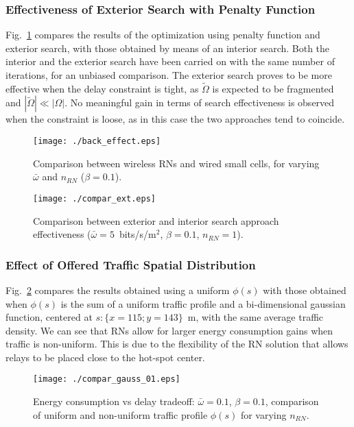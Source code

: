 \documentclass[draftcls,onecolumn]{IEEEtran}
\theoremstyle{plain}
\theoremstyle{definition}
\begin{document}
\subsubsection{Effectiveness of Exterior Search with Penalty Function}
Fig.~\ref{fig:compar_ext} compares the results of the optimization using penalty function and exterior search, with those obtained by means of an interior search. Both the interior and the exterior search have been carried on with the same number of iterations, for an unbiased comparison. The exterior search proves to be more effective when the delay constraint is tight, as $\tilde{\Omega}$ is expected to be fragmented and $|\tilde{\Omega}| \ll |\Omega |$. No meaningful gain in terms of search effectiveness is observed when the constraint is loose, as in this case the two approaches tend to coincide.
\begin{figure}
\centering
\begin{minipage}{.47\textwidth}
\centering
\texttt{[image: ./back\_effect.eps]} 
\caption{Comparison between wireless RNs and wired small cells, for varying $\bar{\omega}$ and $n_{RN}$ ($\beta=0.1$).}
\label{fig:back_effect}
\end{minipage}\hfill
\begin{minipage}{.47\textwidth}
\centering
\texttt{[image: ./compar\_ext.eps]}
\caption{Comparison between exterior and interior search approach effectiveness ($\bar{\omega}=5$~bits/s/m$^2$, $\beta=0.1$, $n_{RN}=1$).}
\label{fig:compar_ext}
\end{minipage}
\end{figure}

\subsubsection{Effect of Offered Traffic Spatial Distribution}\label{non_unif}
Fig.~\ref{fig:compar_gauss} compares the results obtained using a uniform $\phi(s)$ with those obtained when $\phi(s)$ is the sum of a uniform traffic profile and a bi-dimensional gaussian function, centered at $s:\{x=115 ; y=143 \}$~m, with the same average traffic density. We can see that RNs allow for larger energy consumption gains when traffic is non-uniform. This is due to the flexibility of the RN solution that allows relays to be placed close to the hot-spot center. 
\begin{figure}[]
 \centering
\texttt{[image: ./compar\_gauss\_01.eps]} 
 \caption{Energy consumption vs delay tradeoff: $\bar{\omega}=0.1$, $\beta=0.1$, comparison of uniform and non-uniform traffic profile $\phi(s)$ for varying $n_{RN}$.}
\label{fig:compar_gauss} 
\end{figure} 
\end{document}
